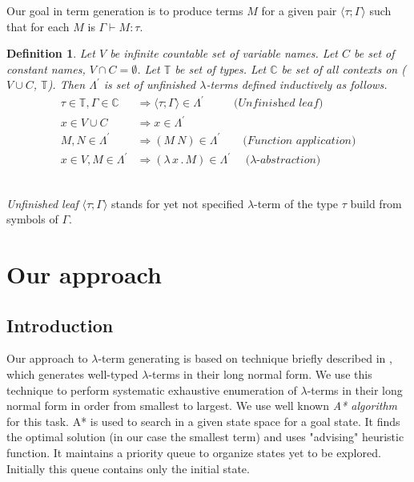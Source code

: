 \documentclass[conference]{IEEEtran}
\newtheorem{definition}{Definition}
\newcommand{\lterm}{$\lambda$-term\xspace}
\newcommand{\lterms}{$\lambda$-terms\xspace}
\newcommand{\tur}[3]{#1\vdash{}#2 \colon #3}
\newcommand{\then}{\Rightarrow\xspace}
\newcommand{\lamb}[2]{( \lambda \, #1 \, . \, #2 )}
\newcommand{\T}{\mathbb{T}\xspace}
\newcommand{\C}{\mathbb{C}\xspace}
\newcommand{\Lpr}{\Lambda^\prime}
\newcommand{\ul}[2]{\langle #1 ; #2 \rangle}
\begin{document}
Our goal in term generation is to produce terms $M$
for a given pair $\ul{\tau}{\Gamma}$
such that for each $M$ is $\tur{\Gamma}{M}{\tau}$.\\

\begin{definition}
Let $V$ be infinite countable set of {\it 
variable names}. Let $C$ be set of {\it constant names}, 
$V \cap C = \emptyset$.	
Let $\T$ be set of types.
Let $\C$ be set of all contexts on ($V \cup C$, $\T$).
Then $\Lpr$ is set of 
\textit{unfinished  \lterms} defined inductively as follows.	
\begin{align*}
\tau \in \T , \Gamma \in \C &\then \ul{\tau}{\Gamma} \in \Lpr
\textit{~~~~~~~~(Unfinished leaf)}\\
x   \in V \cup C  &\then x     \in \Lpr \\
M,N \in \Lpr   &\then (M~N) \in \Lpr 
\textit{~~~~~~(Function application)} \\
x   \in V , M \in \Lpr &\then \lamb{x}{M} \in \Lpr
\textit{~~~~($\lambda$-abstraction)} 
\end{align*}
\end{definition}
~\\

\textit{Unfinished leaf} $\ul{\tau}{\Gamma}$ 
stands for yet not specified \lterm of the type $\tau$ 
build from symbols of $\Gamma$.



\section{Our approach}
\label{approach}

\subsection{Introduction}

Our approach to \lterm generating is based on technique 
briefly described in \cite{barendregt10}, which generates
well-typed \lterms in their long normal form. 
We use this technique to perform systematic exhaustive enumeration
of \lterms in their long normal form in order from smallest to largest.
We use well known \textit{A* algorithm} \cite{AIMA} for this task.
A* is used to search in a given state space for a goal state. 
It finds the optimal solution (in our case the smallest term)
and uses "advising" heuristic function.
It maintains a priority queue to organize states yet to be explored.
Initially this queue contains only the initial state.  
\end{document}
